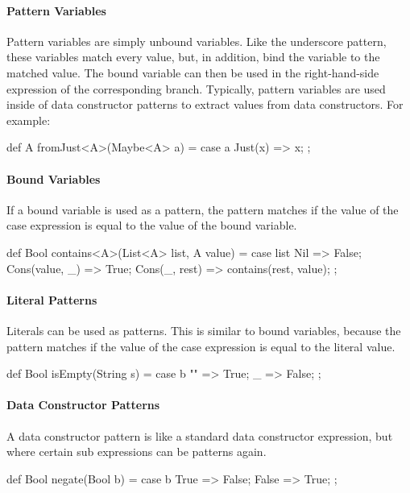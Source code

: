 \paragraph{Pattern Variables}
Pattern variables are simply unbound variables.
Like the underscore pattern, these variables match every value, but, in addition, bind the variable to the matched value. The bound variable can then be used in the right-hand-side expression of the corresponding branch.
Typically, pattern variables are used inside of data constructor patterns to extract values from data constructors.
For example:
\begin{abscode}
def A fromJust<A>(Maybe<A> a) = 
  case a { 
    Just(x) => x; 
  };
\end{abscode}

\paragraph{Bound Variables}
If a bound variable is used as a pattern, the pattern matches if the value of the case expression is equal to the value of the bound variable.

\begin{abscode}
def Bool contains<A>(List<A> list, A value) =
  case list {
    Nil => False;
    Cons(value, _) => True;
    Cons(_, rest) => contains(rest, value);
  };
\end{abscode}

\paragraph{Literal Patterns}
Literals can be used as patterns. This is similar to bound variables, because the pattern matches if the value of the case expression is equal to the literal value.

\begin{abscode}
def Bool isEmpty(String s) =
  case b {
    "" => True;
    _  => False;
  };
\end{abscode}

\paragraph{Data Constructor Patterns}
A data constructor pattern is like a standard data constructor expression, but where certain sub expressions can be patterns again.

\begin{abscode}
def Bool negate(Bool b) =
  case b {
    True => False;
    False => True;
  };
\end{abscode}

